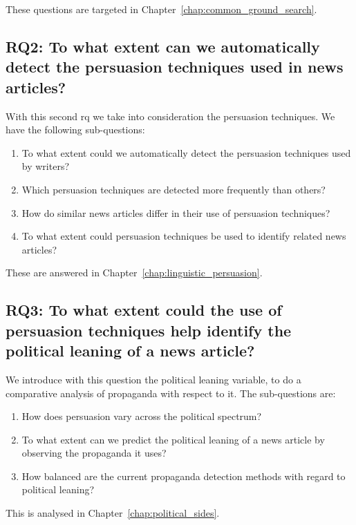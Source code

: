 These questions are targeted in Chapter~\ref{chap:common_ground_search}.

\subsection*{RQ2: To what extent can we automatically detect the persuasion techniques used in news articles?}

With this second \acrlong{rq} we take into consideration the persuasion techniques. We have the following sub-questions:

\begin{enumerate}[label={\textbf{RQ2.\arabic*:}},leftmargin=2cm]
    \item To what extent could we automatically detect the persuasion techniques used by writers?
    \item Which persuasion techniques are detected more frequently than others?
    \item How do similar news articles differ in their use of persuasion techniques?
    \item To what extent could persuasion techniques be used to identify related news articles?
\end{enumerate}

These are answered in Chapter~\ref{chap:linguistic_persuasion}.

\subsection*{RQ3: To what extent could the use of persuasion techniques help identify the political leaning of a news article?}

We introduce with this question the political leaning variable, to do a comparative analysis of propaganda with respect to it. The sub-questions are:

\begin{enumerate}[label={\textbf{RQ3.\arabic*:}},leftmargin=2cm]
    \item How does persuasion vary across the political spectrum?
    \item To what extent can we predict the political leaning of a news article by observing the propaganda it uses?
    \item How balanced are the current propaganda detection methods with regard to political leaning?
\end{enumerate}

This is analysed in Chapter~\ref{chap:political_sides}.

